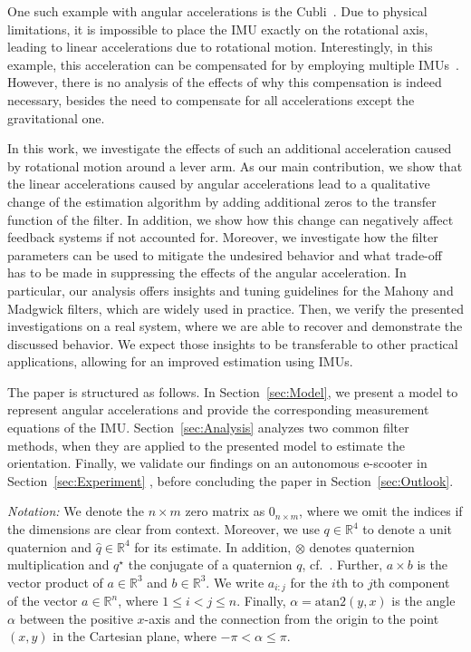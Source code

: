 One such example with angular accelerations is the Cubli~\cite{Gajamohan2012}.
Due to physical limitations, it is impossible to place the \ac{IMU} exactly on the rotational axis, leading to linear accelerations due to rotational motion.
Interestingly, in this example, this acceleration can be compensated for by employing multiple \acp{IMU}~\cite{Gajamohan2012, Trimpe2010}.
However, there is no analysis of the effects of why this compensation is indeed necessary, besides the need to compensate for all accelerations except the gravitational one.

In this work, we investigate the effects of such an additional acceleration caused by rotational motion around a lever arm.
As our main contribution, we show that the linear accelerations caused by angular accelerations lead to a qualitative change of the estimation algorithm by adding additional zeros to the transfer function of the filter.
In addition, we show how this change can negatively affect feedback systems if not accounted for.
Moreover, we investigate how the filter parameters can be used to mitigate the undesired behavior and what trade-off has to be made in suppressing the effects of the angular acceleration.
In particular, our analysis offers insights and tuning guidelines for the Mahony and Madgwick filters, which are widely used in practice.
Then, we verify the presented investigations on a real system, where we are able to recover and demonstrate the discussed behavior.
We expect those insights to be transferable to other practical applications, allowing for an improved estimation using \acp{IMU}.

The paper is structured as follows.
In Section~\ref{sec:Model}, we present a model to represent angular accelerations and provide the corresponding measurement equations of the \ac{IMU}.
Section~\ref{sec:Analysis} analyzes two common filter methods, when they are applied to the presented model to estimate the orientation.
Finally, we validate our findings on an autonomous \ac{e-scooter} in Section~\ref{sec:Experiment} \cite{Soloperto2021}, before concluding the paper in Section~\ref{sec:Outlook}.


\emph{Notation:}
We denote the $n\times m$ zero matrix as $0_{n\times m}$, where we omit the indices if the dimensions are clear from context.
Moreover, we use $q\in\mathbb{R}^4$ to denote a unit quaternion and $\hat{q}\in\mathbb{R}^4$ for its estimate. 
In addition, $\otimes$ denotes quaternion multiplication and $q^\star$ the conjugate of a quaternion $q$, cf.\ \cite{Berner2007}.
Further, $a \times b$ is the vector product of $a\in\mathbb{R}^3$ and $b\in\mathbb{R}^3$.
We write $a_{i:j}$ for the $i$th to $j$th component of the vector $a\in\mathbb{R}^n$, where $1\leq i<j\leq n$. 
Finally, $\alpha = \mathrm{atan2}(y,x)$ is the angle $\alpha$ between the positive $x$-axis and the connection from the origin to the point $(x,y)$ in the Cartesian plane, where $-\pi<\alpha\leq \pi$.